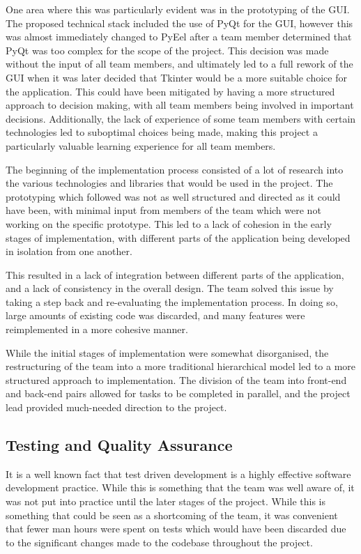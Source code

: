 \documentclass[conference]{IEEEtran}
\begin{document}
One area where this was particularly evident was in the prototyping of the GUI. The proposed technical stack included the use of PyQt for the GUI, however this was almost immediately changed to PyEel after a team member determined that PyQt was too complex for the scope of the project. This decision was made without the input of all team members, and ultimately led to a full rework of the GUI when it was later decided that Tkinter would be a more suitable choice for the application. This could have been mitigated by having a more structured approach to decision making, with all team members being involved in important decisions. Additionally, the lack of experience of some team members with certain technologies led to suboptimal choices being made, making this project a particularly valuable learning experience for all team members.

The beginning of the implementation process consisted of a lot of research into the various technologies and libraries that would be used in the project. The prototyping which followed was not as well structured and directed as it could have been, with minimal input from members of the team which were not working on the specific prototype. This led to a lack of cohesion in the early stages of implementation, with different parts of the application being developed in isolation from one another.

This resulted in a lack of integration between different parts of the application, and a lack of consistency in the overall design. The team solved this issue by taking a step back and re-evaluating the implementation process. In doing so, large amounts of existing code was discarded, and many features were reimplemented in a more cohesive manner. 

While the initial stages of implementation were somewhat disorganised, the restructuring of the team into a more traditional hierarchical model led to a more structured approach to implementation. The division of the team into front-end and back-end pairs allowed for tasks to be completed in parallel, and the project lead provided much-needed direction to the project.

\subsection{Testing and Quality Assurance}
It is a well known fact that test driven development is a highly effective software development practice. While this is something that the team was well aware of, it was not put into practice until the later stages of the project. While this is something that could be seen as a shortcoming of the team, it was convenient that fewer man hours were spent on tests which would have been discarded due to the significant changes made to the codebase throughout the project. 
\end{document}
